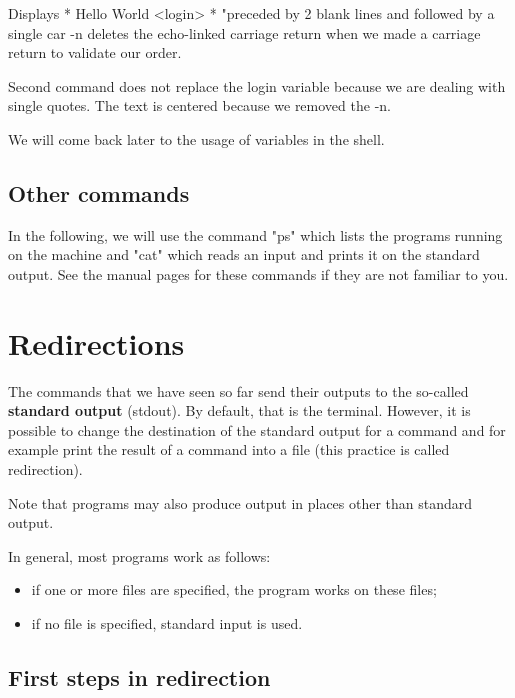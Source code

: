 \documentclass[11pt]{article}
\begin{document}
\begin{solution}
	Displays * Hello World <login> * "preceded by 2 blank lines and followed by a single car -n deletes the echo-linked carriage return when we made a carriage return to validate our order.
	
	Second command does not replace the login variable because we are dealing with single quotes. The text is centered because we removed the -n.
	
	We will come back later to the usage of variables in the shell.
	
\end{solution}

\subsection{Other commands}

In the following, we will use the command "ps" which lists the programs running on the machine and "cat" which reads an input and prints it on the standard output. See the manual pages for these commands if they are not familiar to you.

\section{Redirections}

The commands that we have seen so far send their outputs to the so-called \textbf{standard output} (stdout). By default, that is the terminal. However, it is possible to change the destination of the standard output for a command and for example print the result of a command into a file (this practice is called redirection).

\noindent Note that programs may also produce output in places other than standard output.
\bigskip

\noindent In general, most programs work as follows:

\begin{itemize}
	\item if one or more files are specified, the program works on these files;
	\item if no file is specified, standard input is used.
\end{itemize}

\subsection{First steps in redirection}
\end{document}
